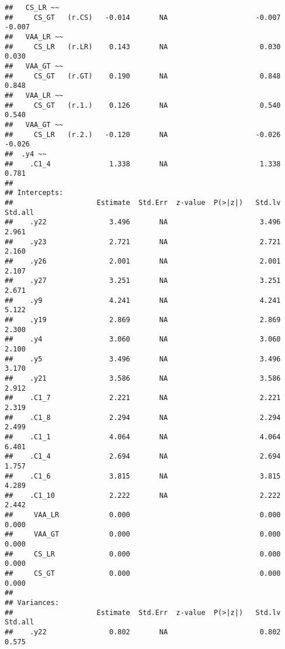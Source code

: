 \documentclass[
]{article}
\begin{document}
\begin{verbatim}
##   CS_LR ~~                                                              
##     CS_GT   (r.CS)   -0.014       NA                     -0.007   -0.007
##   VAA_LR ~~                                                             
##     CS_LR   (r.LR)    0.143       NA                      0.030    0.030
##   VAA_GT ~~                                                             
##     CS_GT   (r.GT)    0.190       NA                      0.848    0.848
##   VAA_LR ~~                                                             
##     CS_GT   (r.1.)    0.126       NA                      0.540    0.540
##   VAA_GT ~~                                                             
##     CS_LR   (r.2.)   -0.120       NA                     -0.026   -0.026
##  .y4 ~~                                                                 
##    .C1_4              1.338       NA                      1.338    0.781
## 
## Intercepts:
##                    Estimate  Std.Err  z-value  P(>|z|)   Std.lv  Std.all
##    .y22               3.496       NA                      3.496    2.961
##    .y23               2.721       NA                      2.721    2.160
##    .y26               2.001       NA                      2.001    2.107
##    .y27               3.251       NA                      3.251    2.671
##    .y9                4.241       NA                      4.241    5.122
##    .y19               2.869       NA                      2.869    2.300
##    .y4                3.060       NA                      3.060    2.100
##    .y5                3.496       NA                      3.496    3.170
##    .y21               3.586       NA                      3.586    2.912
##    .C1_7              2.221       NA                      2.221    2.319
##    .C1_8              2.294       NA                      2.294    2.499
##    .C1_1              4.064       NA                      4.064    6.401
##    .C1_4              2.694       NA                      2.694    1.757
##    .C1_6              3.815       NA                      3.815    4.289
##    .C1_10             2.222       NA                      2.222    2.442
##     VAA_LR            0.000                               0.000    0.000
##     VAA_GT            0.000                               0.000    0.000
##     CS_LR             0.000                               0.000    0.000
##     CS_GT             0.000                               0.000    0.000
## 
## Variances:
##                    Estimate  Std.Err  z-value  P(>|z|)   Std.lv  Std.all
##    .y22               0.802       NA                      0.802    0.575

\end{verbatim}
\end{document}
